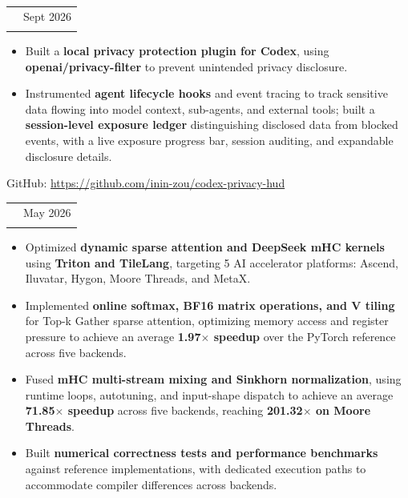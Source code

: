 \documentclass[a4paper,10pt]{article}
\makeatletter
\newcommand{\DetailFont}{\fontsize{9.5}{11.5}\selectfont}
\newlength{\EntryGap}
\newlength{\BulletGap}
\newlength{\HeadingToBullets}
\newenvironment{resumeBullets}{%
  \begin{itemize}[
    leftmargin=12pt,
    labelsep=5pt,
    label=\textbullet,
    itemsep=\BulletGap,
    parsep=0pt,
    topsep=\HeadingToBullets,
    partopsep=0pt
  ]
}{%
  \end{itemize}
}
\newcommand{\entry}[3]{%
  \Needspace{7\baselineskip}%
  \begin{tabularx}{\linewidth}{
    @{}
    >{\raggedright\arraybackslash}X
    @{\hspace{12pt}}
    r
    @{}
  }
    {\fontsize{11}{13}\selectfont\bfseries #1}
      & {\DetailFont #2}\\[2pt]
    \multicolumn{2}{@{}p{\linewidth}@{}}{
      {\fontsize{10}{12}\selectfont\itshape #3}
    }\\
  \end{tabularx}\par\nobreak
}
\newcommand{\projectLink}[1]{%
  {\DetailFont GitHub: \url{#1}\par}
}
\makeatother
\begin{document}
\entry
  {Codex Privacy HUD}
  {Sept 2026}
  {OpenAI Privacy Hackathon, Agentic AI Track Winner}

\begin{resumeBullets}
  \item Built a \textbf{local privacy protection plugin for Codex}, using \textbf{openai/privacy-filter} to prevent unintended privacy disclosure.

  \item Instrumented \textbf{agent lifecycle hooks} and event tracing to track sensitive data flowing into model context, sub-agents, and external tools; built a \textbf{session-level exposure ledger} distinguishing disclosed data from blocked events, with a live exposure progress bar, session auditing, and expandable disclosure details.
\end{resumeBullets}

\projectLink{https://github.com/inin-zou/codex-privacy-hud}

\vspace{\EntryGap}

\entry
  {GPU Kernel Optimization}
  {May 2026}
  {GOSIM KernelGen Paris 2026, Sparse Attention 1st Place Winner (solo)}

\begin{resumeBullets}
  \item Optimized \textbf{dynamic sparse attention and DeepSeek mHC kernels} using \textbf{Triton and TileLang}, targeting 5 AI accelerator platforms: Ascend, Iluvatar, Hygon, Moore Threads, and MetaX.

  \item Implemented \textbf{online softmax, BF16 matrix operations, and V tiling} for Top-k Gather sparse attention, optimizing memory access and register pressure to achieve an average \textbf{1.97$\times$ speedup} over the PyTorch reference across five backends.

  \item Fused \textbf{mHC multi-stream mixing and Sinkhorn normalization}, using runtime loops, autotuning, and input-shape dispatch to achieve an average \textbf{71.85$\times$ speedup} across five backends, reaching \textbf{201.32$\times$ on Moore Threads}.

  \item Built \textbf{numerical correctness tests and performance benchmarks} against reference implementations, with dedicated execution paths to accommodate compiler differences across backends.
\end{resumeBullets}
\end{document}
